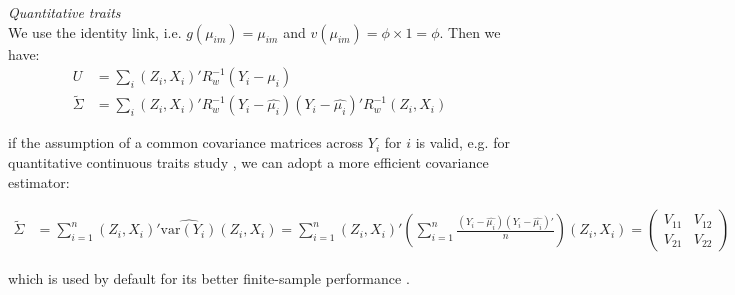 \documentclass[compress]{beamer}
\begin{document}
{\framebreak
\textit{Quantitative traits}\\
\indent We use the identity link, i.e. $g(\mu_{im}) = \mu_{im}$ and $v(\mu_{im}) = \phi \times 1 = \phi$. Then we have:
\begin{align}
U & = \sum_{i}\left(Z_{i},X_{i}\right)' R_w^{-1} (Y_{i}-\mu_{i}) \nonumber\\
\widetilde{\Sigma} & = \sum_{i}\left(Z_{i},X_{i}\right)' R_w^{-1} (Y_{i}-\hat{\mu_{i}})(Y_{i}-\hat{\mu_{i}})' R_w^{-1} \left(Z_{i},X_{i}\right)
\label{eq:2}
\end{align}

if the assumption of a common covariance matrices across $Y_i$ for $i$ is valid, e.g. for quantitative continuous traits study \cite{pan2001robust}, we can adopt a more efficient covariance estimator:
\begin{tiny}
\begin{align*}
\widetilde{\Sigma} & = \sum_{i=1}^n \left(Z_{i},X_{i}\right)'\widehat{\textrm{var}(Y_{i})}\left(Z_{i},X_{i}\right)
 = \sum_{i=1}^n \left(Z_{i},X_{i}\right)'\left(\sum_{i=1}^n \frac{(Y_{i}-\hat{\mu_{i}})(Y_{i}-\hat{\mu_{i}})'}{n}\right)\left(Z_{i},X_{i}\right) = 
\begin{pmatrix}
V_{11} & V_{12}\\
 V_{21} & V_{22}
\end{pmatrix}
\end{align*}
\end{tiny}
which is used by default for its better finite-sample performance \cite{pan2001robust}.\\

}
\end{document}

